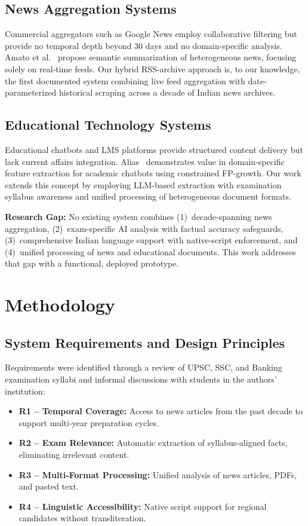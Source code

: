 \documentclass[conference]{IEEEtran}
\begin{document}
\subsection{News Aggregation Systems}
Commercial aggregators such as Google News employ collaborative filtering but provide no temporal depth beyond 30 days and no domain-specific analysis. Amato et al.~\cite{amato2017semantic} propose semantic summarization of heterogeneous news, focusing solely on real-time feeds. Our hybrid RSS-archive approach is, to our knowledge, the first documented system combining live feed aggregation with date-parameterized historical scraping across a decade of Indian news archives.

\subsection{Educational Technology Systems}
Educational chatbots and LMS platforms provide structured content delivery but lack current affairs integration. Alias~\cite{alias2021unsupervised} demonstrates value in domain-specific feature extraction for academic chatbots using constrained FP-growth. Our work extends this concept by employing LLM-based extraction with examination syllabus awareness and unified processing of heterogeneous document formats.

\textbf{Research Gap:} No existing system combines (1)~decade-spanning news aggregation, (2)~exam-specific AI analysis with factual accuracy safeguards, (3)~comprehensive Indian language support with native-script enforcement, and (4)~unified processing of news and educational documents. This work addresses that gap with a functional, deployed prototype.

\section{Methodology}

\subsection{System Requirements and Design Principles}
Requirements were identified through a review of UPSC, SSC, and Banking examination syllabi and informal discussions with students in the authors' institution:

\begin{itemize}[leftmargin=*, nosep]
  \item \textbf{R1 – Temporal Coverage:} Access to news articles from the past decade to support multi-year preparation cycles.
  \item \textbf{R2 – Exam Relevance:} Automatic extraction of syllabus-aligned facts, eliminating irrelevant content.
  \item \textbf{R3 – Multi-Format Processing:} Unified analysis of news articles, PDFs, and pasted text.
  \item \textbf{R4 – Linguistic Accessibility:} Native script support for regional candidates without transliteration.
\end{itemize}
\end{document}
